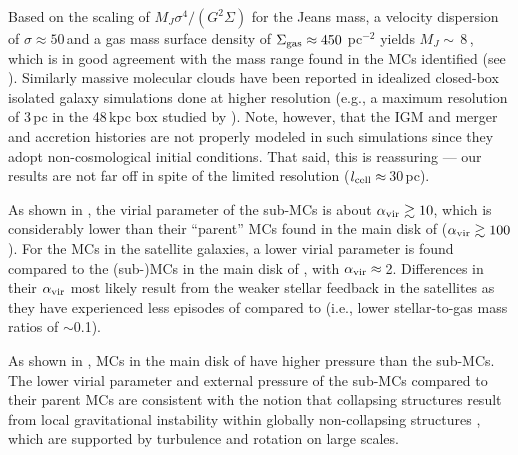 \IfFileExists{emulateapjlegacy.cls}{\documentclass[iop]{emulateapjlegacy}}{\documentclass[iop]{emulateapj}}
\begin{document}
Based on the scaling of $M_J$\eq$\sigma^4/(G^2\Sigma)$ for the Jeans mass, a
velocity dispersion of $\sigma\approx50$\,\kms and a
gas mass surface density of $\Sigma_{\rm gas}\approx450$\,\Msun\,pc$^{-2}$ yields
$M_J\sim$\,8\,\Msun, which is in good agreement with the mass range found in the MCs identified (see ).
%
Similarly massive molecular clouds have been reported in idealized closed-box isolated galaxy simulations done at higher resolution (e.g., a maximum
resolution of 3\,pc in the 48\,kpc box studied by \citealt{Behrendt16a}).
Note, however, that the IGM and merger and accretion histories are not properly modeled in such simulations since they adopt non-cosmological initial conditions. That said, this is reassuring --- our results are not far off in spite of the limited resolution ($l_{\rm cell}\approx$\,30\,pc).


As shown in ,
the virial parameter of the sub-MCs is about $\alpha_{\rm vir}\gtrsim10$, which is considerably lower than their ``parent'' MCs found in the main disk of \flower ($\alpha_{\rm vir}\gtrsim100$).
%
For the MCs in the satellite galaxies, a lower virial parameter is found compared to the (sub-)MCs in the main disk of \flower, with $\alpha_{\rm vir}\approx$\,2.
Differences in their $\alpha_{\rm vir}$ most likely result from the weaker stellar feedback in the satellites as they have experienced less episodes of \SF compared to \flower (i.e., lower stellar-to-gas mass ratios of $\sim$0.1).

As shown in ,
MCs in the main disk of \flower have higher pressure than the sub-MCs. The lower virial parameter and external pressure of the sub-MCs compared to their parent MCs are consistent with the notion that collapsing structures result from local gravitational instability within globally non-collapsing structures \citep[see e.g.,][]{Ballesteros-Paredes11a}, which are supported by turbulence and rotation on large scales.
\end{document}
